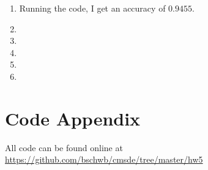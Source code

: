\documentclass[a4paper,11pt]{scrartcl}
\begin{document}
\begin{enumerate}

\item
  Running the code, I get an accuracy of $0.9455$.

\item

\item

\item

\item

\item


\end{enumerate}
 
\section*{Code Appendix}

All code can be found online at
\url{https://github.com/bschwb/cmsde/tree/master/hw5}

% 

% 
\end{document}
